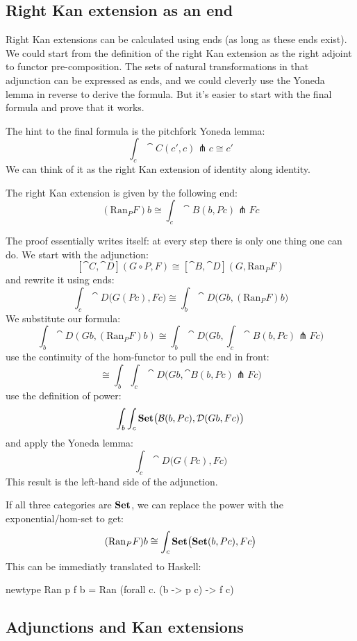 \documentclass[DaoFP]{subfiles}
\begin{document}
 
 

\subsection{Right Kan extension as an end}

Right Kan extensions can be calculated using ends (as long as these ends exist). We could start from the definition of the right Kan extension as the right adjoint to functor pre-composition. The sets of natural transformations in that adjunction can be expressed as ends, and we could cleverly use the Yoneda lemma in reverse to derive the formula. But it's easier to start with the final formula and prove that it works. 

The hint to the final formula is the pitchfork Yoneda lemma:
\[ \int_c \cat C (c', c) \pitchfork c \cong c' \]
We can think of it as the right Kan extension of identity along identity.
 
The right Kan extension is given by the following end:
 \[ (\text{Ran}_P F) b \cong \int_c \cat B (b, P c) \pitchfork F c \]
 
 The proof essentially writes itself: at every step there is only one thing one can do. We start with the adjunction:
  \[ [\cat C, \cat D](G \circ P, F) \cong [\cat B, \cat D](G, \text{Ran}_P F) \]
and rewrite it using ends:
 \[ \int_c \cat D \big(G ( P c), F c\big) \cong \int_b \cat D\big(G b, (\text{Ran}_P F) b\big) \]
We substitute our formula:
 \[  \int_b \cat D(G b, (\text{Ran}_P F) b) \cong  \int_b \cat D\big(G b,\int_c \cat B (b, P c) \pitchfork F c \big)\]
use the continuity of the hom-functor to pull the end in front:
\[  \cong  \int_b \int_c \cat D\big(G b, \cat B (b, P c) \pitchfork F c \big) \]
use the definition of power:
\[ \int_b \int_c \mathbf{Set} \big(  \mathcal{B} (b, P c), \mathcal{D} (G b, F c) \big) \]
and apply the Yoneda lemma:
\[ \int_c  \cat D \big(G (P c), F c\big) \]
This result is the left-hand side of the adjunction.
 
If all three categories are $\mathbf{Set}$, we can replace the power with the exponential/hom-set to get:
  \[ (\text{Ran}_P F) b \cong \int_c \mathbf{Set} \big( \mathbf{Set} (b, P c), F c\big) \]
This can be immediatly translated to Haskell:
 \begin{haskell}
 newtype Ran p f b = Ran (forall c. (b -> p c) -> f c)
 \end{haskell}
 
 \subsection{Adjunctions and Kan extensions}
 
\end{document}
